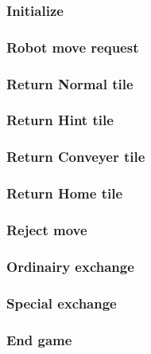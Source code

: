	\subsubsection{Initialize}
  	
    	
	\subsubsection{Robot move request}
	

	\subsubsection{Return Normal tile}
	

	\subsubsection{Return Hint tile}
	

	\subsubsection{Return Conveyer tile}
	

	\subsubsection{Return Home tile}
	


	\subsubsection{Reject move}
	


	\subsubsection{Ordinairy exchange}
	
	
	\subsubsection{Special exchange}
	
	
	\subsubsection{End game}
	
